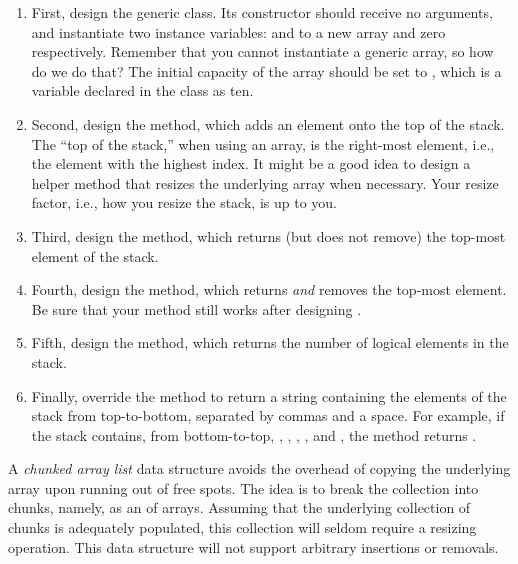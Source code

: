 \begin{enumerate}[label=(\alph*)]
    \item First, design the generic  class. Its constructor should receive no arguments, and instantiate two instance variables:  and  to a new array and zero respectively. Remember that you cannot instantiate a generic array, so how do we do that? The initial capacity of the array should be set to , which is a  variable declared in the class as ten.

    \item Second, design the  method, which adds an element onto the top of the stack. The ``top of the stack,'' when using an array, is the right-most element, i.e., the element with the highest index. It might be a good idea to design a  helper method that resizes the underlying array when necessary. Your resize factor, i.e., how you resize the stack, is up to you.

    \item Third, design the  method, which returns (but does not remove) the top-most element of the stack.

    \item Fourth, design the  method, which returns \textit{and} removes the top-most element. Be sure that your  method still works after designing .

    \item Fifth, design the  method, which returns the number of logical elements in the stack.

    \item Finally, override the  method to return a string containing the elements of the stack from top-to-bottom, separated by commas and a space. For example, if the stack contains, from bottom-to-top, , , , , and , the  method returns .
\end{enumerate}


A \emph{chunked array list} data structure avoids the overhead of copying the underlying array upon running out of free spots. The idea is to break the collection into chunks, namely, as an  of arrays. Assuming that the underlying collection of chunks is adequately populated, this collection will seldom require a resizing operation. This data structure will not support arbitrary insertions or removals.

